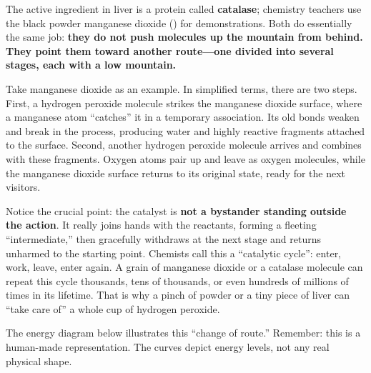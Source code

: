 The active ingredient in liver is a protein called \textbf{catalase}; chemistry teachers use the black powder manganese dioxide () for demonstrations. Both do essentially the same job: \textbf{they do not push molecules up the mountain from behind. They point them toward another route---one divided into several stages, each with a low mountain.}

Take manganese dioxide as an example. In simplified terms, there are two steps. First, a hydrogen peroxide molecule strikes the manganese dioxide surface, where a manganese atom ``catches'' it in a temporary association. Its old bonds weaken and break in the process, producing water and highly reactive fragments attached to the surface. Second, another hydrogen peroxide molecule arrives and combines with these fragments. Oxygen atoms pair up and leave as oxygen molecules, while the manganese dioxide surface returns to its original state, ready for the next visitors.

Notice the crucial point: the catalyst is \textbf{not a bystander standing outside the action}. It really joins hands with the reactants, forming a fleeting ``intermediate,'' then gracefully withdraws at the next stage and returns unharmed to the starting point. Chemists call this a ``catalytic cycle'': enter, work, leave, enter again. A grain of manganese dioxide or a catalase molecule can repeat this cycle thousands, tens of thousands, or even hundreds of millions of times in its lifetime. That is why a pinch of powder or a tiny piece of liver can ``take care of'' a whole cup of hydrogen peroxide.

The energy diagram below illustrates this ``change of route.'' Remember: this is a human-made representation. The curves depict energy levels, not any real physical shape.

\begin{center}
\end{center}

